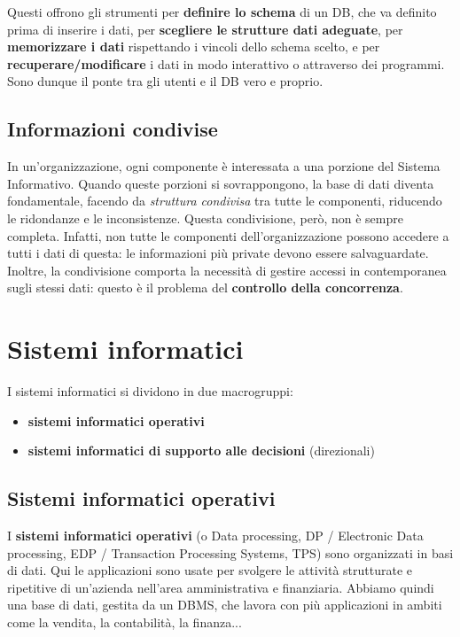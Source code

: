 \documentclass[11pt, a4paper, titlepage, oneside]{scrbook}
\begin{document}
Questi offrono gli strumenti per \textbf{definire lo schema} di un DB, che va definito prima di inserire i dati, per \textbf{scegliere le strutture dati adeguate}, per \textbf{memorizzare i dati} rispettando i vincoli dello schema scelto, e per \textbf{recuperare/modificare} i dati in modo interattivo o attraverso dei programmi. Sono dunque il ponte tra gli utenti e il DB vero e proprio.

\subsection{Informazioni condivise}

In un'organizzazione, ogni componente è interessata a una porzione del Sistema Informativo. Quando queste porzioni si sovrappongono, la base di dati diventa fondamentale, facendo da \textit{struttura condivisa} tra tutte le componenti, riducendo le ridondanze e le inconsistenze. Questa condivisione, però, non è sempre completa. Infatti, non tutte le componenti dell'organizzazione possono accedere a tutti i dati di questa: le informazioni più private devono essere salvaguardate. Inoltre, la condivisione comporta la necessità di gestire accessi in contemporanea sugli stessi dati: questo è il problema del \textbf{controllo della concorrenza}. 

\section{Sistemi informatici}

I sistemi informatici si dividono in due macrogruppi:
\begin{itemize}
    \item \textbf{sistemi informatici operativi}
    \item \textbf{sistemi informatici di supporto alle decisioni} (direzionali)
\end{itemize}

\subsection{Sistemi informatici operativi}

I \textbf{sistemi informatici operativi} (o Data processing, DP / Electronic Data processing, EDP / Transaction Processing Systems, TPS) sono organizzati in basi di dati. Qui le applicazioni sono usate per svolgere le attività strutturate e ripetitive di un'azienda nell'area amministrativa e finanziaria. Abbiamo quindi una base di dati, gestita da un DBMS, che lavora con più applicazioni in ambiti come la vendita, la contabilità, la finanza...
\end{document}
